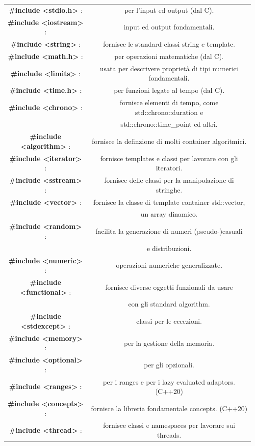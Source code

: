 \begin{tabular}{cc}
	\textbf{\#include <stdio.h>} : & \textsf{\small per l'input ed output (dal C).} \\
	\textbf{\#include <iostream>} : & \textsf{\small input ed output fondamentali.} \\
	\textbf{\#include <string>} : & \textsf{\small fornisce le standard classi string e template.} \\
	\textbf{\#include <math.h>} : & \textsf{\small per operazioni matematiche (dal C).} \\
	\textbf{\#include <limits>} : & \textsf{\small usata per descrivere proprietà di tipi numerici fondamentali.} \\
	\textbf{\#include <time.h>} : & \textsf{\small per funzioni legate al tempo (dal C).} \\
	\textbf{\#include <chrono>} : & \textsf{\small fornisce elementi di tempo, come std::chrono::duration e } \\
	\textbf{} & \textsf{\small std::chrono::time\_point ed altri.} \\
	\textbf{\#include <algorithm>} : & \textsf{\small fornisce la definzione di molti container algoritmici.} \\
	\textbf{\#include <iterator>} : & \textsf{\small fornisce templates e classi per lavorare con gli iteratori.} \\
	\textbf{\#include <sstream>} : & \textsf{\small fornisce delle classi per la manipolazione di stringhe.} \\
	\textbf{\#include <vector>} : & \textsf{\small fornisce la classe di template container std::vector, } \\
	\textbf{} & \textsf{\small un array dinamico.} \\
	\textbf{\#include <random>} : & \textsf{\small facilita la generazione di numeri (pseudo-)casuali } \\
	\textbf{} & \textsf{\small e distribuzioni.} \\
	\textbf{\#include <numeric>} : & \textsf{\small operazioni numeriche generalizzate.} \\
	\textbf{\#include <functional>} : & \textsf{\small fornisce diverse oggetti funzionali da usare } \\
	\textbf{} & \textsf{\small con gli standard algorithm.} \\
	\textbf{\#include <stdexcept>} : & \textsf{\small classi per le eccezioni.} \\
	\textbf{\#include <memory>} : & \textsf{\small per la gestione della memoria.} \\
	\textbf{\#include <optional>} : & \textsf{\small per gli opzionali.} \\
	\textbf{\#include <ranges>} : & \textsf{\small per i ranges e per i lazy evaluated adaptors. (C++20)} \\
	\textbf{\#include <concepts>} : & \textsf{\small fornisce la libreria fondamentale concepts. (C++20)} \\
	\textbf{\#include <thread>} : & \textsf{\small fornisce classi e namespaces per lavorare sui threads.} \\
\end{tabular} \break

